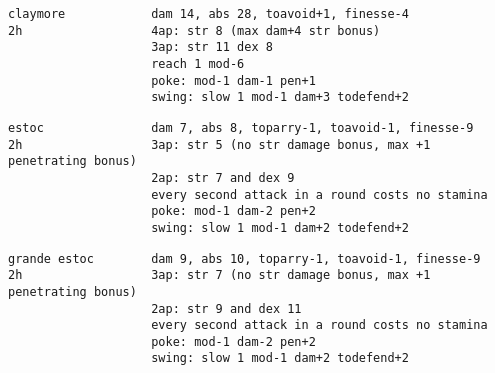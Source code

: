 \begin{samepage}
\begin{verbatim}
claymore            dam 14, abs 28, toavoid+1, finesse-4
2h                  4ap: str 8 (max dam+4 str bonus)
                    3ap: str 11 dex 8
                    reach 1 mod-6
                    poke: mod-1 dam-1 pen+1
                    swing: slow 1 mod-1 dam+3 todefend+2
\end{verbatim} \blocklistgap \begin{verbatim}
estoc               dam 7, abs 8, toparry-1, toavoid-1, finesse-9
2h                  3ap: str 5 (no str damage bonus, max +1 penetrating bonus)
                    2ap: str 7 and dex 9
                    every second attack in a round costs no stamina
                    poke: mod-1 dam-2 pen+2
                    swing: slow 1 mod-1 dam+2 todefend+2
\end{verbatim} \blocklistgap \begin{verbatim}
grande estoc        dam 9, abs 10, toparry-1, toavoid-1, finesse-9
2h                  3ap: str 7 (no str damage bonus, max +1 penetrating bonus)
                    2ap: str 9 and dex 11
                    every second attack in a round costs no stamina
                    poke: mod-1 dam-2 pen+2
                    swing: slow 1 mod-1 dam+2 todefend+2
\end{verbatim} \end{samepage} \normalsize \goodbreak

\

